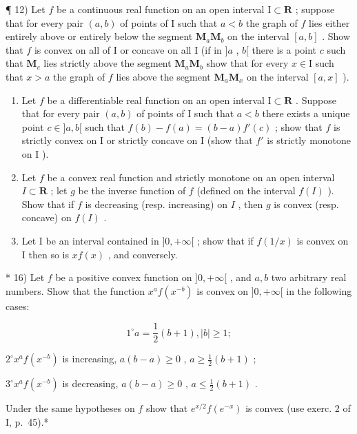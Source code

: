 ¶ 12) Let \(f\) be a continuous real function on an open interval \(\mathrm{I}\subset \mathbf{R}\) ; suppose that for every pair \((a,b)\) of points of I such that \(a < b\) the graph of \(f\) lies either entirely above or entirely below the segment \(\mathbf{M}_a\mathbf{M}_b\) on the interval \([a,b]\) . Show that \(f\) is convex on all of I or concave on all I (if in \(]a\) , \(b[\) there is a point \(c\) such that \(\mathbf{M}_c\) lies strictly above the segment \(\mathbf{M}_a\mathbf{M}_b\) show that for every \(x\in \mathrm{I}\) such that \(x > a\) the graph of \(f\) lies above the segment \(\mathbf{M}_a\mathbf{M}_x\) on the interval \([a,x]\) ).

\begin{enumerate}
\def\labelenumi{\arabic{enumi})}
\setcounter{enumi}{12}
\item
  Let \(f\) be a differentiable real function on an open interval \(\mathrm{I} \subset \mathbf{R}\) . Suppose that for every pair \((a, b)\) of points of \(\mathrm{I}\) such that \(a < b\) there exists a unique point \(c \in ]a, b[\) such that \(f(b) - f(a) = (b - a)f'(c)\) ; show that \(f\) is strictly convex on \(\mathrm{I}\) or strictly concave on \(\mathrm{I}\) (show that \(f'\) is strictly monotone on \(\mathrm{I}\) ).
\item
  Let \(f\) be a convex real function and strictly monotone on an open interval \(I \subset \mathbf{R}\) ; let \(g\) be the inverse function of \(f\) (defined on the interval \(f(I)\) ). Show that if \(f\) is decreasing (resp. increasing) on \(I\) , then \(g\) is convex (resp. concave) on \(f(I)\) .
\item
  Let I be an interval contained in \(]0, +\infty[\) ; show that if \(f(1 / x)\) is convex on I then so is \(xf(x)\) , and conversely.
\end{enumerate}

* 16) Let \(f\) be a positive convex function on \(]0, +\infty[\) , and \(a, b\) two arbitrary real numbers. Show that the function \(x^a f(x^{-b})\) is convex on \(]0, +\infty[\) in the following cases:

\[
1 ^ {\circ} a = \frac {1}{2} (b + 1), | b | \geqslant 1;
\]

\(2^{\circ} x^{a} f(x^{-b})\) is increasing, \(a(b - a) \geqslant 0\) , \(a \geqslant \frac{1}{2}(b + 1)\) ;

\(3^{\circ} x^{a} f(x^{-b})\) is decreasing, \(a(b-a) \geqslant 0\) , \(a \leqslant \frac{1}{2}(b+1)\) .

Under the same hypotheses on \(f\) show that \(e^{x / 2}f(e^{-x})\) is convex (use exerc. 2 of I, p.~45).*

